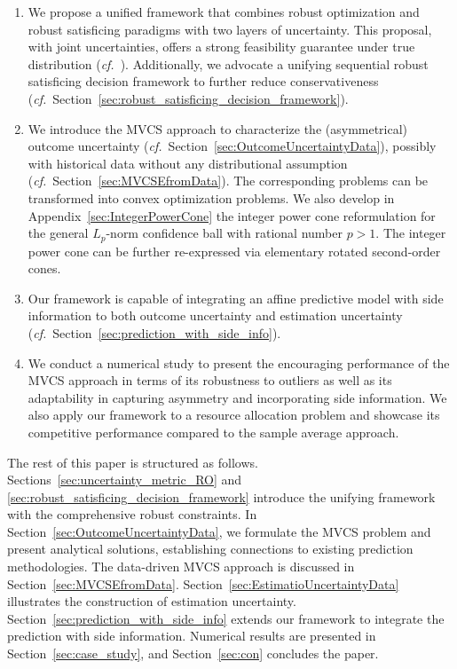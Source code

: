 \documentclass[opre, nonblindrev]{informswp}
\newcommand{\1}[1]{\mathds{1}{\left(#1\right)}}
\begin{document}
\begin{enumerate}
\item We propose a unified framework that combines robust optimization and robust satisficing paradigms with two layers of uncertainty. This proposal, with joint uncertainties, offers a strong feasibility guarantee under true distribution (\textit{cf.}~). Additionally, we advocate a unifying sequential robust satisficing decision framework to further reduce conservativeness (\textit{cf.}~Section~\ref{sec:robust_satisficing_decision_framework}).
\item We introduce the MVCS approach to characterize the (asymmetrical) outcome uncertainty (\textit{cf.}~Section~\ref{sec:OutcomeUncertaintyData}),  possibly with historical data without any distributional assumption (\textit{cf.}~Section~\ref{sec:MVCSEfromData}). The corresponding problems can be transformed into convex optimization problems. We also develop in Appendix~\ref{sec:IntegerPowerCone} the integer power cone reformulation for the general $L_p$-norm confidence ball with rational number $p>1$. The integer power cone can be further re-expressed via elementary rotated second-order cones.
\item Our framework is capable of integrating an affine predictive model with side information to both outcome uncertainty and estimation uncertainty (\textit{cf.}~Section~\ref{sec:prediction_with_side_info}).
\item We conduct a numerical study to present the encouraging performance of the MVCS approach in terms of its robustness to outliers as well as its adaptability in capturing asymmetry and incorporating side information. We also apply our framework to a resource allocation problem and showcase its competitive performance compared to the sample average approach.
\end{enumerate}


The rest of this paper is structured as follows. Sections~\ref{sec:uncertainty_metric_RO} and \ref{sec:robust_satisficing_decision_framework} introduce the unifying framework with the comprehensive robust constraints. In Section~\ref{sec:OutcomeUncertaintyData}, we formulate the MVCS problem and present analytical solutions, establishing connections to existing prediction methodologies. The data-driven MVCS approach is discussed in Section~\ref{sec:MVCSEfromData}. Section~\ref{sec:EstimatioUncertaintyData} illustrates the construction of estimation uncertainty. Section~\ref{sec:prediction_with_side_info} extends our framework to integrate the prediction with side information. Numerical results are presented in Section~\ref{sec:case_study}, and Section~\ref{sec:con} concludes the paper.
\end{document}
